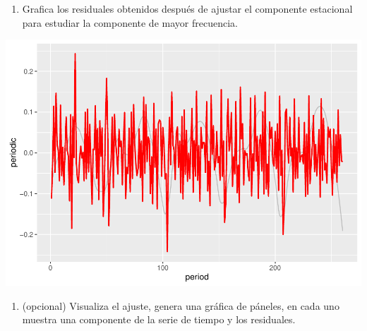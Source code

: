 \documentclass[
]{article}
\newenvironment{Shaded}{\begin{snugshade}}{\end{snugshade}}
\newcommand{\AttributeTok}[1]{\textcolor[rgb]{0.13,0.29,0.53}{#1}}
\newcommand{\FloatTok}[1]{\textcolor[rgb]{0.00,0.00,0.81}{#1}}
\newcommand{\FunctionTok}[1]{\textcolor[rgb]{0.13,0.29,0.53}{\textbf{#1}}}
\newcommand{\NormalTok}[1]{#1}
\newcommand{\OtherTok}[1]{\textcolor[rgb]{0.56,0.35,0.01}{#1}}
\newcommand{\SpecialCharTok}[1]{\textcolor[rgb]{0.81,0.36,0.00}{\textbf{#1}}}
\newcommand{\StringTok}[1]{\textcolor[rgb]{0.31,0.60,0.02}{#1}}
\providecommand{\tightlist}{%
  \setlength{\itemsep}{0pt}\setlength{\parskip}{0pt}}
\begin{document}
\begin{enumerate}
\def\labelenumi{\arabic{enumi}.}
\setcounter{enumi}{3}
\tightlist
\item
  Grafica los residuales obtenidos después de ajustar el componente
  estacional para estudiar la componente de mayor frecuencia.
\end{enumerate}

\begin{Shaded}
\end{Shaded}

\includegraphics{tarea-eda-2_files/figure-latex/unnamed-chunk-6-1.pdf}

\begin{enumerate}
\def\labelenumi{\arabic{enumi}.}
\setcounter{enumi}{4}
\tightlist
\item
  (opcional) Visualiza el ajuste, genera una gráfica de páneles, en cada
  uno muestra una componente de la serie de tiempo y los residuales.
\end{enumerate}
\end{document}
